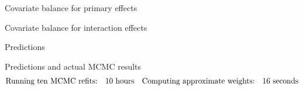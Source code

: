 


\begin{frame}{Covariate balance for primary effects}
\AlexanderImbalancePrimary{}
\end{frame}


\begin{frame}{Covariate balance for interaction effects}
\AlexanderImbalanceInteraction{}
\end{frame}




\begin{frame}[t]{Predictions}
    \AlexanderPredictionFigOne{}
\end{frame}


\begin{frame}[t]{Predictions and actual MCMC results}
    \AlexanderPredictionFigTwo{}
    \vspace{-3em}
    $$
    \begin{aligned}
        \textrm{Running ten MCMC refits:}\quad & 10 \textrm{ hours} &
        \textrm{Computing approximate weights:}\quad &16 \textrm{ seconds}\\
    \end{aligned}
    $$
\end{frame}

